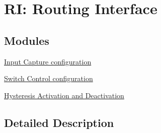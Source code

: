 \hypertarget{group___r_i___macris}{\section{R\-I\-: Routing Interface}
\label{group___r_i___macris}
}
\subsection*{Modules}
\begin{DoxyCompactItemize}
\item 
\hyperlink{group___r_i___input_caputure_config}{Input Capture configuration}
\item 
\hyperlink{group___r_i___switch_control_config}{Switch Control configuration}
\item 
\hyperlink{group___r_i___hyst_config}{Hysteresis Activation and Deactivation}
\end{DoxyCompactItemize}


\subsection{Detailed Description}
